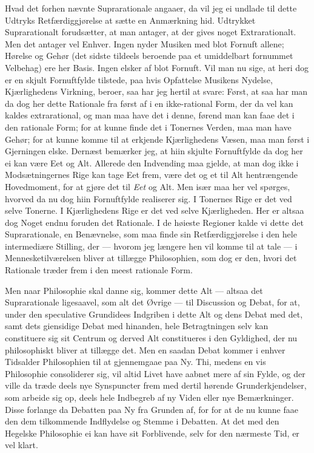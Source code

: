 \documentclass[12pt,a4paper]{book}
\newcommand{\apage}[1]{\marginnote{\footnotesize\textit{[#1]}}}
\begin{document}
Hvad det forhen nævnte Suprarationale angaaer, da vil jeg ei undlade
til dette Udtryks Retfærdiggjørelse at sætte en Anmærkning hid.
Udtrykket Suprarationalt forudsætter, at man antager, at der gives
noget Extrarationalt. Men det antager vel Enhver. Ingen nyder Musiken
med blot Fornuft allene; Hørelse og Gehør (det sidste tildeels beroende
paa et umiddelbart fornummet Velbehag) ere her Basis. Ingen elsker af
blot Fornuft. Vil man nu sige, at heri dog er en skjult Fornuftfylde
tilstede, paa hvis Opfattelse Musikens Nydelse, Kjærlighedens Virkning,
beroer, saa har jeg hertil at svare: Først, at saa har man da dog her
dette Rationale fra først af i en ikke-rational Form, der da vel kan
kaldes extrarational, og man maa have det i denne, førend man kan faae
det i den rationale Form; for at kunne finde det i Tonernes Verden, maa
man have Gehør; for at kunne komme til at erkjende Kjærlighedens Væsen,
maa man først i Gjerningen elske. Dernæst bemærker jeg, at hiin skjulte
Fornuftfylde da dog her ei kan være Eet og Alt. Allerede den Indvending
maa gjelde, at man dog ikke i Modsætningernes Rige kan tage Eet frem,
være det og et til Alt hentrængende Hovedmoment, for at gjøre det til
\emph{Eet} og Alt. Men især maa her \apage{49} vel spørges, hvorved da nu dog hiin
Fornuftfylde realiserer sig. I Tonernes Rige er det ved selve Tonerne.
I Kjærlighedens Rige er det ved selve Kjærligheden. Her er altsaa dog
Noget endnu foruden det Rationale. I de høieste Regioner kalde vi dette
det Suprarationale, en Benævnelse, som maa finde sin Retfærdiggjørelse
i den hele intermediære Stilling, der --- hvorom jeg længere hen vil
komme til at tale --- i Mennesketilværelsen bliver at tillægge
Philosophien, som dog er den, hvori det Rationale træder frem i den
meest rationale Form.

Men naar Philosophie skal danne sig, kommer dette Alt --- altsaa det
Suprarationale ligesaavel, som alt det Øvrige --- til Discussion og
Debat, for at, under den speculative Grundidees Indgriben i dette Alt
og dens Debat med det, samt dets giensidige Debat med hinanden, hele
Betragtningen selv kan constituere sig sit Centrum og derved Alt
constitueres i den Gyldighed, der nu philosophiskt bliver at tillægge
det. Men en saadan Debat kommer i enhver Tidsalder Philosophien til at
gjennemgaae paa Ny. Thi, medens en vis Philosophie consoliderer sig,
vil altid Livet have aabnet mere af sin Fylde, og der ville da træde
deels nye Synspuncter frem med dertil hørende Grunderkjendelser, som
arbeide sig op, deels hele Indbegreb af ny Viden eller nye
Bemærkninger. Disse forlange da Debatten paa Ny fra Grunden af, for
for at de nu kunne faae den dem tilkommende Indflydelse og Stemme i
Debatten.
At det med den Hegelske Philosophie ei kan have sit Forblivende, selv
for den nærmeste Tid, er vel klart.
\end{document}
